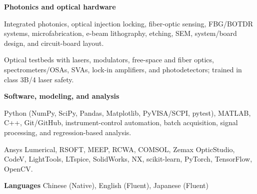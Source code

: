 
\begin{cventries}

  \cventry
    {\textbf{Photonics and optical hardware}}
    {}
    {}
    {}
    {
      \begin{cvitems}
        \item {Integrated photonics, optical injection locking, fiber-optic sensing, FBG/BOTDR systems, microfabrication, e-beam lithography, etching, SEM, system/board design, and circuit-board layout.}
        \item {Optical testbeds with lasers, modulators, free-space and fiber optics, spectrometers/OSAs, SVAs, lock-in amplifiers, and photodetectors; trained in class 3B/4 laser safety.}
      \end{cvitems}
    }

  \cventry
    {\textbf{Software, modeling, and analysis}}
    {}
    {}
    {}
    {
      \begin{cvitems}
        \item {Python (NumPy, SciPy, Pandas, Matplotlib, PyVISA/SCPI, pytest), MATLAB, C++, Git/GitHub, instrument-control automation, batch acquisition, signal processing, and regression-based analysis.}
        \item {Ansys Lumerical, RSOFT, MEEP, RCWA, COMSOL, Zemax OpticStudio, CodeV, LightTools, LTspice, SolidWorks, NX, scikit-learn, PyTorch, TensorFlow, OpenCV.}
      \end{cvitems}
    }

  \cventry
    {\textbf{Languages}}
    {}
    {}
    {}
    {Chinese (Native), English (Fluent), Japanese (Fluent)}

\end{cventries}
